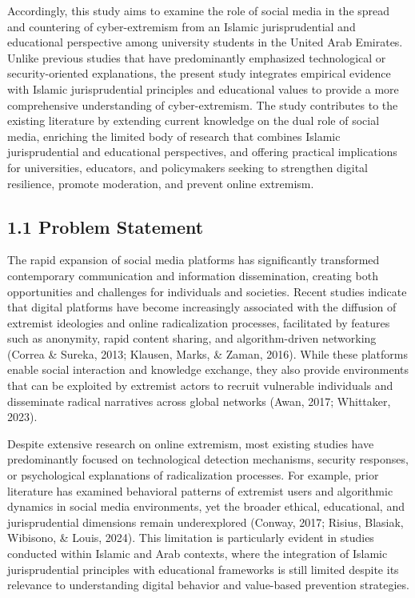 \documentclass[10pt]{NSP1}
\begin{document}
	Accordingly, this study aims to examine the role of social media in the spread and countering of cyber-extremism from an Islamic jurisprudential and educational perspective among university students in the United Arab Emirates. Unlike previous studies that have predominantly emphasized technological or security-oriented explanations, the present study integrates empirical evidence with Islamic jurisprudential principles and educational values to provide a more comprehensive understanding of cyber-extremism. The study contributes to the existing literature by extending current knowledge on the dual role of social media, enriching the limited body of research that combines Islamic jurisprudential and educational perspectives, and offering practical implications for universities, educators, and policymakers seeking to strengthen digital resilience, promote moderation, and prevent online extremism.
	
	\subsection*{1.1 Problem Statement}
	
	The rapid expansion of social media platforms has significantly transformed contemporary communication and information dissemination, creating both opportunities and challenges for individuals and societies. Recent studies indicate that digital platforms have become increasingly associated with the diffusion of extremist ideologies and online radicalization processes, facilitated by features such as anonymity, rapid content sharing, and algorithm-driven networking (Correa \& Sureka, 2013; Klausen, Marks, \& Zaman, 2016). While these platforms enable social interaction and knowledge exchange, they also provide environments that can be exploited by extremist actors to recruit vulnerable individuals and disseminate radical narratives across global networks (Awan, 2017; Whittaker, 2023).
	
	Despite extensive research on online extremism, most existing studies have predominantly focused on technological detection mechanisms, security responses, or psychological explanations of radicalization processes. For example, prior literature has examined behavioral patterns of extremist users and algorithmic dynamics in social media environments, yet the broader ethical, educational, and jurisprudential dimensions remain underexplored (Conway, 2017; Risius, Blasiak, Wibisono, \& Louis, 2024). This limitation is particularly evident in studies conducted within Islamic and Arab contexts, where the integration of Islamic jurisprudential principles with educational frameworks is still limited despite its relevance to understanding digital behavior and value-based prevention strategies.
	
\end{document}

